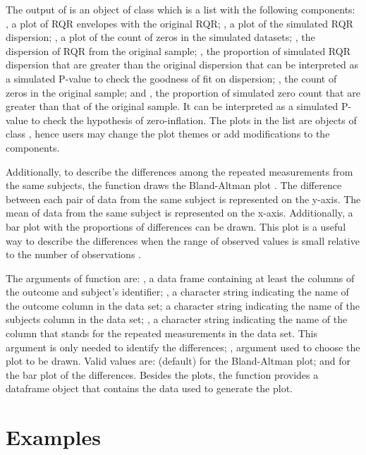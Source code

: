 The output of  is an object of class  which is
a list with the following components: , a plot of RQR
envelopes with the original RQR; , a plot of the
simulated RQR dispersion; , a plot of the count of zeros
in the simulated datasets; , the dispersion of RQR from
the original sample; , the proportion of simulated RQR
dispersion that are greater than the original dispersion that can be
interpreted as a simulated P-value to check the goodness of fit on
dispersion; , the count of zeros in the original
sample; and , the proportion of simulated zero count that
are greater than that of the original sample. It can be interpreted as a
simulated P-value to check the hypothesis of zero-inflation. The plots
in the list are objects of class , hence users may change
the plot themes or add modifications to the components.

Additionally, to describe the differences among the repeated
measurements from the same subjects, the function  draws
the Bland-Altman plot \citep{bland1995}. The difference between each
pair of data from the same subject is represented on the y-axis. The
mean of data from the same subject is represented on the x-axis.
Additionally, a bar plot with the proportions of differences can be
drawn. This plot is a useful way to describe the differences when the
range of observed values is small relative to the number of observations
\citep{Smith2010}.

The arguments of  function are: , a data frame
containing at least the columns of the outcome and subject's identifier;
, a character string indicating the name of the outcome column in
the data set;  a character string indicating the name of the
subjects column in the data set; , a character string indicating
the name of the column that stands for the repeated measurements in the
data set. This argument is only needed to identify the differences;
, argument used to choose the plot to be drawn. Valid values
are:  (default) for the Bland-Altman plot; and  for
the bar plot of the differences. Besides the plots, the function
provides a dataframe object that contains the data used to generate the
plot.

\hypertarget{examples}{%
\section{Examples}\label{examples}}

